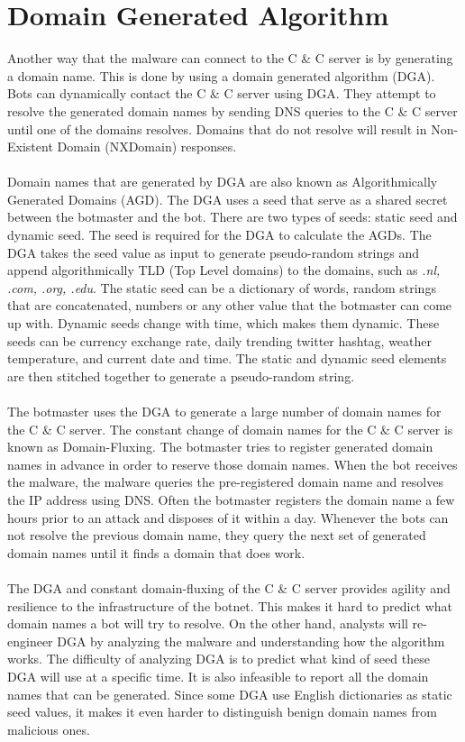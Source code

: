 \section{Domain Generated Algorithm}
Another way that the malware can connect to the C \& C server is by generating a domain name. This is done by using a domain generated algorithm (DGA). Bots can dynamically contact the C \& C server using DGA. They attempt to resolve the generated domain names by sending DNS queries to the C \& C server until one of the domains resolves. Domains that do not resolve will result in Non-Existent Domain (NXDomain) responses.\\\\
Domain names that are generated by DGA are also known as Algorithmically Generated Domains (AGD). The DGA uses a seed that serve as a shared secret between the botmaster and the bot. There are two types of seeds: static seed and dynamic seed. The seed is required for the DGA to calculate the AGDs. The DGA takes the seed value as input to generate pseudo-random strings and append algorithmically TLD (Top Level domains) to the domains, such as \textit{.nl, .com, .org, .edu}. The static seed can be a dictionary of words, random strings that are concatenated, numbers or any other value that the botmaster can come up with. Dynamic seeds change with time, which makes them dynamic. These seeds can be currency exchange rate, daily trending twitter hashtag, weather temperature, and current date and time. The static and dynamic seed elements are then stitched together to generate a pseudo-random string. \\\\
The botmaster uses the DGA to generate a large number of domain names for the C \& C server. The constant change of domain names for the C \& C server is known as Domain-Fluxing. The botmaster tries to register generated domain names in advance in order to reserve those domain names. When the bot receives the malware, the malware queries the pre-registered domain name and resolves the IP address using DNS. Often the botmaster registers the domain name a few hours prior to an attack and disposes of it within a day. Whenever the bots can not resolve the previous domain name, they query the next set of generated domain names until it finds a domain that does work. \\\\
The DGA and constant domain-fluxing of the C \& C server provides agility and resilience to the infrastructure of the botnet. This makes it hard to predict what domain names a bot will try to resolve. On the other hand, analysts will re-engineer DGA by analyzing the malware and understanding how the algorithm works. The difficulty of analyzing DGA is to predict what kind of seed these DGA will use at a specific time. It is also infeasible to report all the domain names that can be generated. Since some DGA use English dictionaries as static seed values, it makes it even harder to distinguish benign domain names from malicious ones. 

